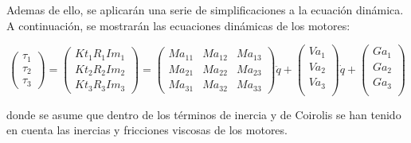 Ademas de ello, se aplicarán una serie de simplificaciones a la ecuación dinámica. A continuación, se mostrarán las ecuaciones dinámicas de los motores:\\
\begin{center}
	$$
	\begin{pmatrix}
	 \tau_{1} \\
	 \tau_{2} \\
	 \tau_ {3}
	\end{pmatrix}=
	\begin{pmatrix}
	Kt_{1}R_{1}Im_{1}  \\
	Kt_{2}R_{2}Im_{2}  \\
	Kt_{3}R_{3}Im_{3}  
	\end{pmatrix} =
	\begin{pmatrix}
	Ma_{11} & Ma_{12} & Ma_{13}  \\
	Ma_{21} & Ma_{22} & Ma_{23}  \\
	Ma_{31} & Ma_{32} & Ma_{33} 
	\end{pmatrix}
	\ddot{q}+
	\begin{pmatrix}
	Va_{1} \\
	Va_{2} \\
	Va_{3} \\
	\end{pmatrix}	
	\dot{q}+
	\begin{pmatrix}
	Ga_{1}  \\
	Ga_{2}  \\
	Ga_{3}\\
	\end{pmatrix}
	$$
\end{center}
donde se asume que dentro de los términos de inercia y de Coirolis se han tenido en cuenta las inercias y fricciones viscosas de los motores.\\

